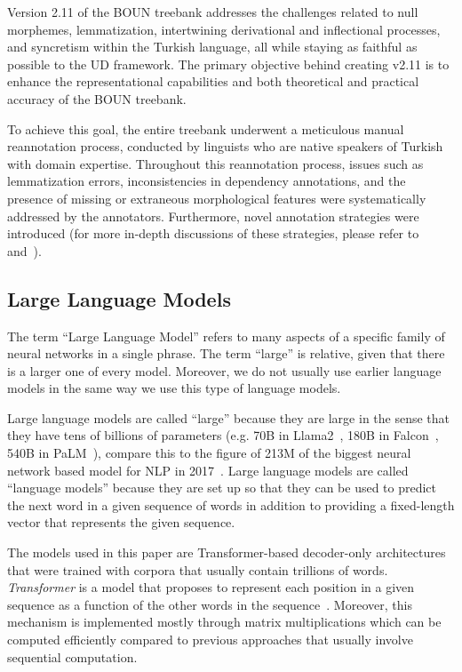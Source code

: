 Version 2.11 of the BOUN treebank addresses the challenges related to null morphemes, lemmatization, intertwining derivational and inflectional processes, and syncretism within the Turkish language, all while staying as faithful as possible to the UD framework.
The primary objective behind creating v2.11 is to enhance the representational capabilities and both theoretical and practical accuracy of the BOUN treebank.

To achieve this goal, the entire treebank underwent a meticulous manual reannotation process, conducted by linguists who are native speakers of Turkish with domain expertise.
Throughout this reannotation process, issues such as lemmatization errors, inconsistencies in dependency annotations, and the presence of missing or extraneous morphological features were systematically addressed by the annotators.
Furthermore, novel annotation strategies were introduced (for more in-depth discussions of these strategies, please refer to~\citeauthor{marcsan2022enhancements} and~\citeauthor{bedir2021overcoming}).

\subsection{Large Language Models}
The term ``Large Language Model'' refers to many aspects of a specific family of neural networks in a single phrase. 
The term ``large'' is relative, given that there is a larger one of every model. 
Moreover, we do not usually use earlier language models in the same way we use this type of language models.

Large language models are called ``large'' because they are large in the sense that they have tens of billions of parameters (e.g. 70B in Llama2~\cite{touvron2023llama2}, 180B in Falcon~\cite{falconllm}, 540B in PaLM~\cite{chowdhery2022palm}), compare this to the figure of 213M of the biggest neural network based model for NLP in 2017~\cite{vaswani2017attention}.
Large language models are called ``language models'' because they are set up so that they can be used to predict the next word in a given sequence of words in addition to providing a fixed-length vector that represents the given sequence.

The models used in this paper are Transformer-based decoder-only architectures that were trained with corpora that usually contain trillions of words. 
\textit{Transformer} is a model that proposes to represent each position in a given sequence as a function of the other words in the sequence~\cite{vaswani2017attention}. 
Moreover, this mechanism is implemented mostly through matrix multiplications which can be computed efficiently compared to previous approaches that usually involve sequential computation.

